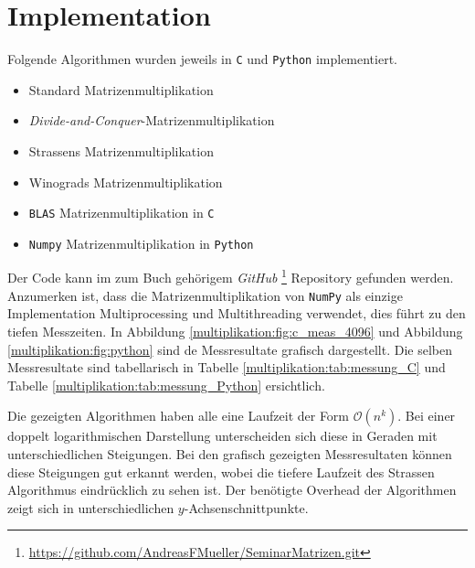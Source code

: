 


\section{Implementation}\label{multiplikation:section:Implementation}

Folgende Algorithmen wurden jeweils in \texttt{C} und \texttt{Python} implementiert.
\begin{itemize}
	\item Standard Matrizenmultiplikation
	\item \textit{Divide-and-Conquer}-Matrizenmultiplikation
	\item Strassens Matrizenmultiplikation
	\item Winograds Matrizenmultiplikation
	\item \texttt{BLAS} Matrizenmultiplikation in \texttt{C}
	\item \texttt{Numpy} Matrizenmultiplikation in \texttt{Python}
\end{itemize}

Der Code kann im zum Buch gehörigem \textit{GitHub} \footnote{\url{https://github.com/AndreasFMueller/SeminarMatrizen.git}} Repository gefunden werden.
Anzumerken ist, dass die Matrizenmultiplikation von \texttt{NumPy} als einzige Implementation Multiprocessing und Multithreading verwendet, dies f\"uhrt zu den tiefen Messzeiten.
In Abbildung
\ref{multiplikation:fig:c_meas_4096}
und Abbildung
\ref{multiplikation:fig:python}
sind de Messresultate grafisch dargestellt.
Die selben Messresultate sind tabellarisch in Tabelle
\ref{multiplikation:tab:messung_C}
und Tabelle
\ref{multiplikation:tab:messung_Python}
ersichtlich.

Die gezeigten Algorithmen haben alle eine Laufzeit der Form $\mathcal{O}(n^k) $.
Bei einer doppelt logarithmischen Darstellung unterscheiden sich diese in Geraden mit unterschiedlichen Steigungen.
Bei den grafisch gezeigten Messresultaten können diese Steigungen gut erkannt werden, wobei die tiefere Laufzeit des Strassen Algorithmus eindrücklich zu sehen ist.
Der benötigte Overhead der Algorithmen zeigt sich in unterschiedlichen $y$-Achsenschnittpunkte.

